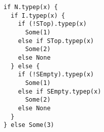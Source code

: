 \begin{lstlisting}[style=reclojureScala]
if N.typep(x) {
  if I.typep(x) {
    if (!STop).typep(x)
      Some(1)
    else if STop.typep(x)
      Some(2)
    else None
  } else {
    if (!SEmpty).typep(x)
      Some(1)
    else if SEmpty.typep(x)
      Some(2)
    else None
  }
} else Some(3)
\end{lstlisting}
